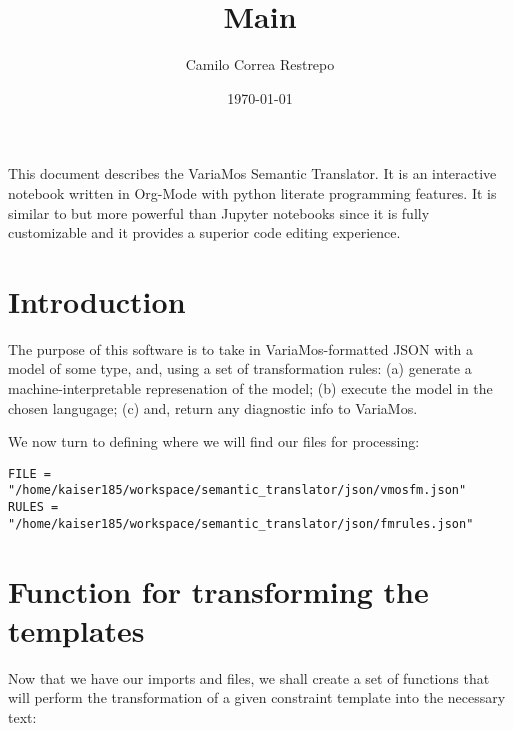 \documentclass[11pt]{article}
\author{Camilo Correa Restrepo}
\date{\today}
\title{Main}
\begin{document}
\maketitle
\tableofcontents

This document describes the VariaMos Semantic Translator.
It is an interactive notebook written in Org-Mode with python literate programming features.
It is similar to but more powerful than Jupyter notebooks since it is fully customizable and it provides a superior code editing experience.

\section{Introduction}
\label{sec:org6ec8ba2}
The purpose of this software is to take in VariaMos-formatted JSON with a model
of some type, and, using a set of transformation rules:
(a) generate a machine-interpretable represenation of the model;
(b) execute the model in the chosen langugage;
(c) and, return any diagnostic info to VariaMos.

We now turn to defining where we will find our files for processing:

\begin{verbatim}
FILE = "/home/kaiser185/workspace/semantic_translator/json/vmosfm.json"
RULES = "/home/kaiser185/workspace/semantic_translator/json/fmrules.json"
\end{verbatim}

\section{Function for transforming the templates}
\label{sec:org626c79a}
Now that we have our imports and files, we shall create a set of functions that will perform the transformation of a given constraint template into the necessary text:
\end{document}
